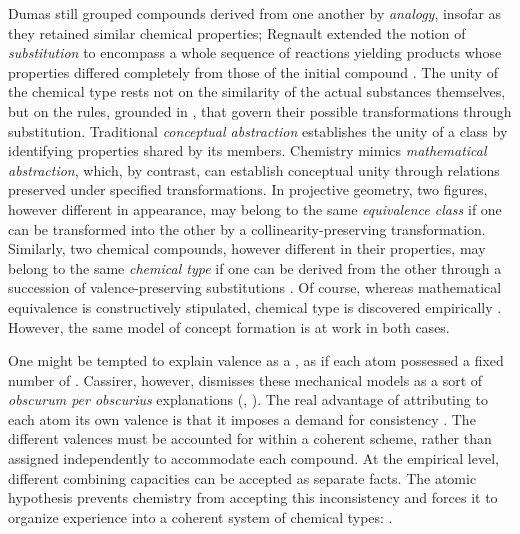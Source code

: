 \documentclass[submitted,12pt]{article}
\begin{document}
Dumas still grouped compounds derived from one another by \emph{analogy}, insofar as they retained similar chemical properties; Regnault extended the notion of \emph{substitution} to encompass a whole sequence of reactions yielding products whose properties differed completely from those of the initial compound . The unity of the chemical type rests not on the similarity of the actual substances themselves, but on the rules, grounded in , that govern their possible transformations through substitution. Traditional \emph{conceptual abstraction} establishes the unity of a class by identifying properties shared by its members. Chemistry mimics \emph{mathematical abstraction}, which, by contrast, can establish conceptual unity through relations preserved under specified transformations. In projective geometry, two figures, however different in appearance, may belong to the same \emph{equivalence class} if one can be transformed into the other by a collinearity-preserving transformation. Similarly, two chemical compounds, however different in their properties, may belong to the same \emph{chemical type} if one can be derived from the other through a succession of valence-preserving substitutions . Of course,  whereas mathematical equivalence is constructively stipulated, chemical type is discovered empirically . However, the same model of concept formation is at work in both cases.

One might be tempted to explain valence as a , as if each atom possessed a fixed number of  . Cassirer, however, dismisses these mechanical models as a sort of \textit{obscurum per obscurius} explanations (, \cite[see][175]{Wurtz1879}). The real advantage of attributing to each atom its own valence is that it imposes a demand for consistency . The different valences must be accounted for within a coherent scheme, rather than assigned independently to accommodate each compound. At the empirical level, different combining capacities can be accepted as separate facts. The atomic hypothesis prevents chemistry from accepting this inconsistency and forces it to organize experience into a coherent system of chemical types:  .
\end{document}
